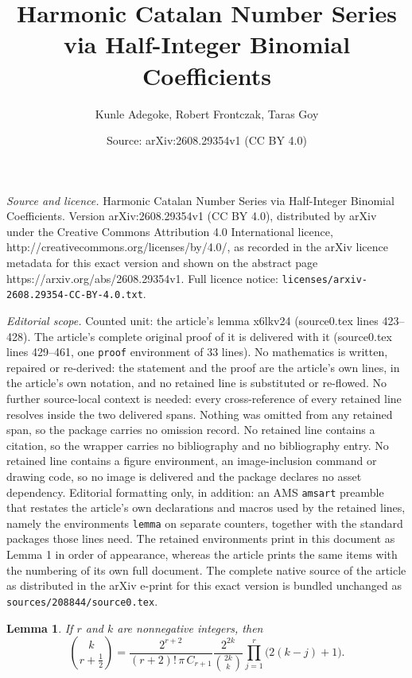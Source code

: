 \documentclass[10pt,a4paper]{amsart}
\title{Harmonic Catalan Number Series via Half-Integer Binomial Coefficients}
\author{Kunle Adegoke, Robert Frontczak, Taras Goy}
\date{Source: arXiv:2608.29354v1 (CC BY 4.0)}
\newtheorem{lemma}{Lemma}
\begin{document}
\maketitle

\noindent\emph{Source and licence.} Harmonic Catalan Number Series via Half-Integer Binomial Coefficients. Version arXiv:2608.29354v1 (CC BY 4.0), distributed by arXiv under the Creative Commons Attribution 4.0 International licence, http://creativecommons.org/licenses/by/4.0/, as recorded in the arXiv licence metadata for this exact version and shown on the abstract page https://arxiv.org/abs/2608.29354v1. Full licence notice: \texttt{licenses/arxiv-2608.29354-CC-BY-4.0.txt}.\par\smallskip

\noindent\textit{Editorial scope.} Counted unit: the article's lemma x6lkv24 (source0.tex lines 423--428). The article's complete original proof of it is delivered with it (source0.tex lines 429--461, one \texttt{proof} environment of 33 lines). No mathematics is written, repaired or re-derived: the statement and the proof are the article's own lines, in the article's own notation, and no retained line is substituted or re-flowed.  No further source-local context is needed: every cross-reference of every retained line resolves inside the two delivered spans.  Nothing was omitted from any retained span, so the package carries no omission record.  No retained line contains a citation, so the wrapper carries no bibliography and no bibliography entry.  No retained line contains a figure environment, an image-inclusion command or drawing code, so no image is delivered and the package declares no asset dependency.  Editorial formatting only, in addition: an AMS \texttt{amsart} preamble that restates the article's own declarations and macros used by the retained lines, namely the environments \texttt{lemma} on separate counters, together with the standard packages those lines need.  The retained environments print in this document as Lemma 1 in order of appearance, whereas the article prints the same items with the numbering of its own full document.  The complete native source of the article as distributed in the arXiv e-print for this exact version is bundled unchanged as \texttt{sources/208844/source0.tex}.
\begin{lemma}\label{x6lkv24}
If $r$ and $k$ are nonnegative integers, then
\begin{equation*}
\binom{{k}}{r + \frac12} = \frac{2^{r + 2}}{(r + 2)!\,\pi\, C_{r + 1}}\frac{2^{2k}}{\binom{{2k}}{k}}\prod_{j = 1}^r \big(2(k - j) + 1\big).
\end{equation*}
\end{lemma}
\end{document}
